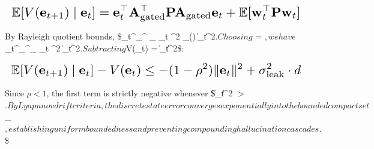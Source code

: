 \documentclass[10pt,twocolumn,letterpaper]{article}
\begin{document}
\begin{equation}
\resizebox{\columnwidth}{!}{$\displaystyle
\begin{aligned}
\mathbb{E}[V(\mathbf{e}_{t+1}) \mid \mathbf{e}_t] = \mathbf{e}_t^\top \mathbf{A}_{\text{gated}}^\top \mathbf{P} \mathbf{A}_{\text{gated}} \mathbf{e}_t + \mathbb{E}[\mathbf{w}_t^\top \mathbf{P} \mathbf{w}_t]
\end{aligned}
$}
\end{equation}

















By Rayleigh quotient bounds, \$\_t^\top {}\_{}^\top {} \_{} \_t \le \rho^2 \lambda\_{\max}() \|\_t\|^2$. Choosing $ = $, we have $\_t^\top {}\_{}^\top {}\_{} \_t \le \rho^2 \|\_t\|^2$. Subtracting $V(\_t) = \|\_t\|^2\$:

















\begin{equation}
\resizebox{\columnwidth}{!}{$\displaystyle
\begin{aligned}
\mathbb{E}[V(\mathbf{e}_{t+1}) \mid \mathbf{e}_t] - V(\mathbf{e}_t) \le -(1 - \rho^2) \|\mathbf{e}_t\|^2 + \sigma_{\text{leak}}^2 \cdot d
\end{aligned}
$}
\end{equation}

















Since $\rho < 1$, the first term is strictly negative whenever \$\|\_t\|^2 $>$ $. By Lyapunov drift criteria, the discrete state error converges exponentially into the bounded compact set $\_\eta$, establishing uniform boundedness and preventing compounding hallucination cascades. $\square\$
\end{document}
